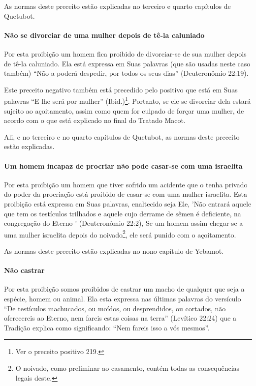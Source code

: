 As normas deste preceito estão explicadas no terceiro e quarto capítulos de Quetubot.

\paragraph{Não se divorciar de uma mulher depois de tê-la caluniado}

Por esta proibição um homem fica proibido de divorciar-se de sua mulher
depois de tê-la caluniado. Ela está expressa em Suas palavras (que são
usadas neste caso também) ``Não a poderá despedir, por todos os seus
dias'' (Deuteronômio 22:19).

Este preceito negativo também está precedido pelo positivo que está em
Suas palavras ``E lhe será por mulher'' (Ibid.)\footnote{Ver o preceito positivo 219.}.
Portanto, se ele se divorciar dela estará sujeito ao açoitamento, assim
como quem for culpado de forçar uma mulher, de acordo com o que está
explicado no final do Tratado Macot.

Ali, e no terceiro e no quarto capítulos de Quetubot, as normas deste
preceito estão explicadas.

\paragraph{Um homem incapaz de procriar não pode casar-se com uma israelita}

Por esta proibição um homem que tiver sofrido um acidente que o tenha
privado do poder da procriação está proibido de casar-se com uma mulher
israelita. Esta proibição está expressa em Suas palavras, enaltecido
seja Ele, 'Não entrará aquele que tem os testículos trilhados e aquele
cujo derrame de sêmen é deficiente, na congregação do Eterno '
(Deuteronômio 22:2), Se um homem assim chegar-se a uma mulher israelita
depois do noivado\footnote{O noivado, como preliminar ao casamento, contém todas as
consequências legais deste.}, ele será punido com o
açoitamento.

As normas deste preceito estão explicadas no nono capítulo de Yebamot.

\paragraph{Não castrar}

Por esta proibição somos proibidos de castrar um macho de qualquer que
seja a espécie, homem ou animal. Ela esta expressa nas últimas palavras
do versículo ``De testículos machucados, ou moídos, ou desprendidos, ou
cortados, não oferecereis ao Eterno, nem fareis estas coisas na terra''
(Levítico 22:24) que a Tradição explica como significando: ``Nem fareis
isso a vós mesmos''.

